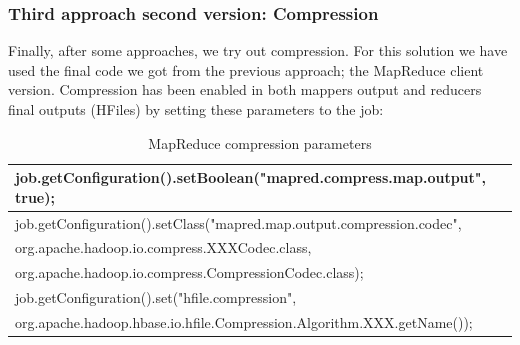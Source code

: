 \subsubsection{Third approach second version: Compression}

Finally, after some approaches, we try out compression. For this solution we have used the final code we got from the previous approach; the MapReduce client version. Compression has been enabled in both mappers output and reducers final outputs (HFiles) by setting these parameters to the job:

\begin{table}[htbp]

\begin{tabular}{|l|}
\hline
job.getConfiguration().setBoolean("mapred.compress.map.output", true); \\ \hline
job.getConfiguration().setClass("mapred.map.output.compression.codec", \\ \hline
org.apache.hadoop.io.compress.XXXCodec.class, \\ \hline
org.apache.hadoop.io.compress.CompressionCodec.class); \\ \hline
job.getConfiguration().set("hfile.compression", \\ \hline
org.apache.hadoop.hbase.io.hfile.Compression.Algorithm.XXX.getName()); \\ \hline
\end{tabular}
\label{}
\caption{MapReduce compression parameters}
\end{table}

